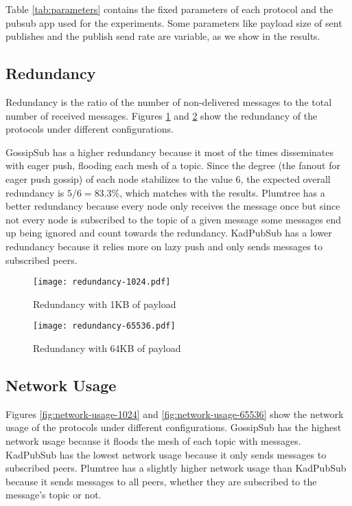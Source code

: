 \documentclass[sigconf]{acmart}
\begin{document}
Table \ref{tab:parameters} contains the fixed parameters of each protocol and the pubsub app used for the experiments. Some parameters like payload size of sent publishes and the publish send rate are variable, as we show in the results.


\subsection{Redundancy}
Redundancy is the ratio of the number of non-delivered messages to the total number of received messages. Figures \ref{fig:redundancy-1024} and \ref{fig:redundancy-65536} show the redundancy of the protocols under different configurations. 

GossipSub has a higher redundancy because it most of the times disseminates with eager push, flooding each mesh of a topic. Since the degree (the fanout for eager push gossip) of each node stabilizes to the value 6, the expected overall redundancy is $5 / 6 = 83.3\%$, which matches with the results.
Plumtree has a better redundancy because every node only receives the message once but since not every node is subscribed to the topic of a given message some messages end up being ignored and count towards the redundancy. KadPubSub has a lower redundancy because it relies more on lazy push and only sends messages to subscribed peers.

\begin{figure}[htp]
    \centering
    \texttt{[image: redundancy-1024.pdf]}
    \caption{Redundancy with 1KB of payload}
    \label{fig:redundancy-1024}
\end{figure}

\begin{figure}[htp]
    \centering
    \texttt{[image: redundancy-65536.pdf]}
    \caption{Redundancy with 64KB of payload}
    \label{fig:redundancy-65536}
\end{figure}

\subsection{Network Usage}
Figures \ref{fig:network-usage-1024} and \ref{fig:network-usage-65536} show the network usage of the protocols under different configurations. GossipSub has the highest network usage because it floods the mesh of each topic with messages. KadPubSub has the lowest network usage because it only sends messages to subscribed peers. Plumtree has a slightly higher network usage than KadPubSub because it sends messages to all peers, whether they are subscribed to the message's topic or not.
\end{document}

